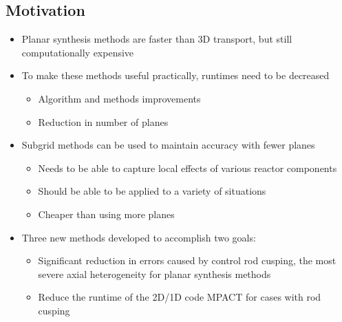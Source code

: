 \subsection{Motivation}
\begin{frame}
    
    \begin{itemize}
        \item Planar synthesis methods are faster than 3D transport, but still computationally expensive
        \item To make these methods useful practically, runtimes need to be decreased
        \begin{itemize}
            \item Algorithm and methods improvements
            \item Reduction in number of planes
        \end{itemize}
        \item Subgrid methods can be used to maintain accuracy with fewer planes
        \begin{itemize}
            \item Needs to be able to capture local effects of various reactor components
            \item Should be able to be applied to a variety of situations
            \item Cheaper than using more planes
        \end{itemize}
        \item Three new methods developed to accomplish two goals:
        \begin{itemize}
            \item Significant reduction in errors caused by control rod cusping, the most severe axial heterogeneity for planar synthesis methods
            \item Reduce the runtime of the 2D/1D code MPACT for cases with rod cusping
        \end{itemize}
    \end{itemize}

\end{frame}